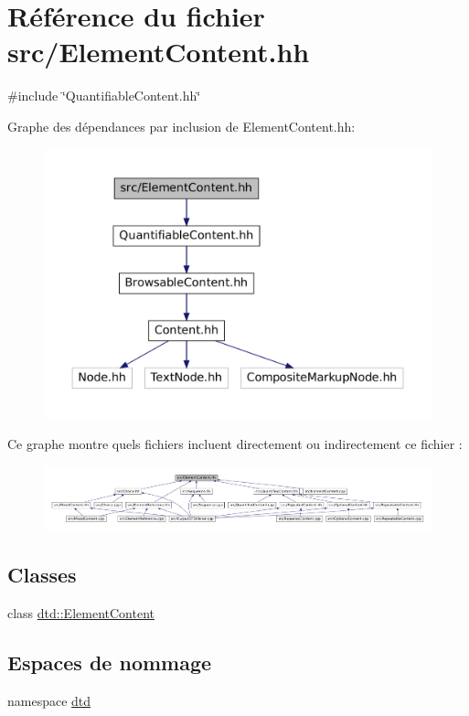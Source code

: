 \hypertarget{_element_content_8hh}{
\section{Référence du fichier src/ElementContent.hh}
\label{_element_content_8hh}
}
{\ttfamily \#include \char`\"{}QuantifiableContent.hh\char`\"{}}\par
Graphe des dépendances par inclusion de ElementContent.hh:\nopagebreak
\begin{figure}[H]
\begin{center}
\leavevmode
\includegraphics[width=400pt]{_element_content_8hh__incl}
\end{center}
\end{figure}
Ce graphe montre quels fichiers incluent directement ou indirectement ce fichier :\nopagebreak
\begin{figure}[H]
\begin{center}
\leavevmode
\includegraphics[width=400pt]{_element_content_8hh__dep__incl}
\end{center}
\end{figure}
\subsection*{Classes}
\begin{DoxyCompactItemize}
\item 
class \hyperlink{classdtd_1_1_element_content}{dtd::ElementContent}
\end{DoxyCompactItemize}
\subsection*{Espaces de nommage}
\begin{DoxyCompactItemize}
\item 
namespace \hyperlink{namespacedtd}{dtd}
\end{DoxyCompactItemize}
